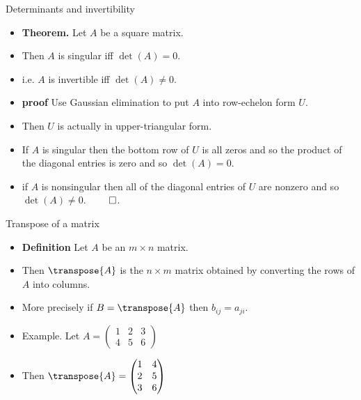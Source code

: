 \documentclass{beamer}
\begin{document}

\begin{frame}{Determinants and invertibility}
\begin{itemize}
\item \textbf{Theorem.} Let $A$ be a square matrix.
\item Then $A$ is singular iff $\det(A) = 0$.
\item i.e. $A$ is invertible iff $\det(A) \not= 0$.
\item \textbf{proof} Use Gaussian elimination to put $A$ into row-echelon
form $U$.
\item Then $U$ is actually in upper-triangular form.
\item If $A$ is singular then the bottom row of $U$ is all zeros and
so the product of the diagonal entries is zero and so $\det(A)=0$.
\item if $A$ is nonsingular then all of the diagonal entries of $U$ are
nonzero and so $\det(A)\not=0$. $\qed$.
\end{itemize}
\end{frame}


\begin{frame}{Transpose of a matrix}
\begin{itemize}
\item \textbf{Definition} Let $A$ be an $m\times n$ matrix.
\item Then $\transpose{A}$ is the $n\times m$ matrix obtained by
converting the rows of $A$ into columns.
\item More precisely if $B=\transpose{A}$ then $b_{ij} = a_{ji}$.
\item Example. Let
$
A=
\begin{pmatrix}
1 & 2 & 3 \\
4 & 5 & 6
\end{pmatrix}
$
\item Then
$
\transpose{A} =
\begin{pmatrix}
1 & 4 \\
2 & 5 \\
3 & 6 \\
\end{pmatrix}
$
\end{itemize}
\end{frame}

\end{document}
